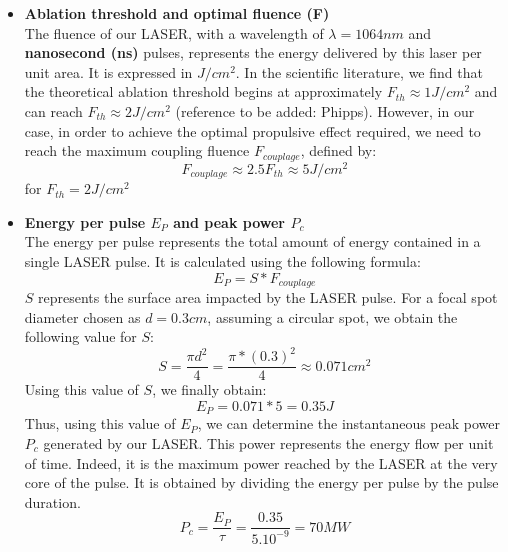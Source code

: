 \documentclass[11pt,a4paper]{article}
\begin{document}
\begin{itemize}
    \item \textbf{Ablation threshold and optimal fluence (F)}\\
    The fluence of our LASER, with a wavelength of $\lambda = 1064 nm$ and \textbf{nanosecond (ns)} pulses, represents the energy delivered by this laser per unit area. It is expressed in \textbf{$J/cm^{2}$}. In the scientific literature, we find that the theoretical ablation threshold begins at approximately $F_{th} \approx 1 J/cm^{2}$ and can reach $F_{th} \approx 2 J/cm^{2}$ (reference to be added: Phipps). However, in our case, in order to achieve the optimal propulsive effect required, we need to reach the maximum coupling fluence $F_{couplage}$, defined by: \\
    \begin{equation}
    \boxed{F_{couplage} \approx  2.5 F_{th} \approx  5 J/cm^{2}}
    \end{equation}
    for $F_{th} = 2 J/cm^{2}$\\

    \item \textbf{Energy per pulse \textbf{$E_{P}$} and peak power \textbf{$P_{c}$}}\\
    The energy per pulse represents the total amount of energy contained in a single LASER pulse. It is calculated using the following formula:
    \begin{equation}
        \boxed{E_{P} = S *  F_{couplage} }
    \end{equation}
    $S$ represents the surface area impacted by the LASER pulse. For a focal spot diameter chosen as $d = 0.3 cm$, assuming a circular spot, we obtain the following value for $S$:
    \begin{equation}
      \boxed{  S = \frac{\pi d^{2}}{4} =\frac{\pi * (0.3)^{2}}{4} \approx 0.071 cm^{2} }
    \end{equation}
    Using this value of $S$, we finally obtain:
    \begin{equation}
        \boxed{E_{P} = 0.071 *5 = 0.35J }
    \end{equation}
    Thus, using this value of $E_{P}$, we can determine the instantaneous peak power \textbf{$P_{c}$} generated by our LASER. This power represents the energy flow per unit of time. Indeed, it is the maximum power reached by the LASER at the very core of the pulse. It is obtained by dividing the energy per pulse by the pulse duration.
    \begin{equation}
        \boxed{P_{c} = \frac{E_{P}}{\tau} = \frac{0.35}{5.10^{-9}} = 70MW}
    \end{equation}
    \\


\end{itemize}
\end{document}
